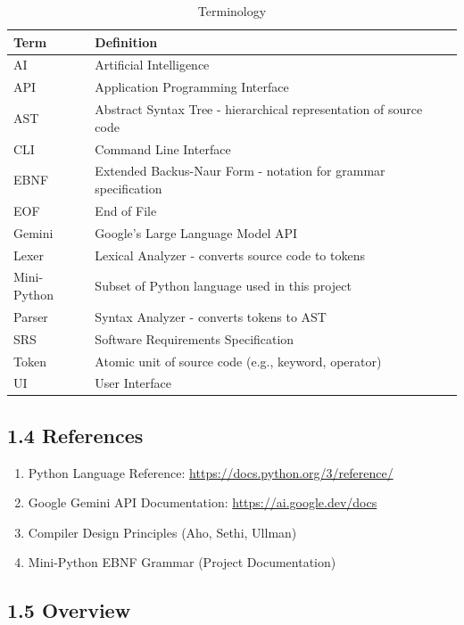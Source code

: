 \documentclass[a4paper,11pt]{article}
\begin{document}
\begin{table}[H]
\centering
\begin{tabularx}{\textwidth}{|l|X|}
\hline
\rowcolor{blue!10}
\textbf{Term} & \textbf{Definition} \\
\hline
AI & Artificial Intelligence \\
\hline
API & Application Programming Interface \\
\hline
AST & Abstract Syntax Tree - hierarchical representation of source code \\
\hline
CLI & Command Line Interface \\
\hline
EBNF & Extended Backus-Naur Form - notation for grammar specification \\
\hline
EOF & End of File \\
\hline
Gemini & Google's Large Language Model API \\
\hline
Lexer & Lexical Analyzer - converts source code to tokens \\
\hline
Mini-Python & Subset of Python language used in this project \\
\hline
Parser & Syntax Analyzer - converts tokens to AST \\
\hline
SRS & Software Requirements Specification \\
\hline
Token & Atomic unit of source code (e.g., keyword, operator) \\
\hline
UI & User Interface \\
\hline
\end{tabularx}
\caption{Terminology}
\end{table}

\subsection{1.4 References}

\begin{enumerate}
    \item Python Language Reference: \url{https://docs.python.org/3/reference/}
    \item Google Gemini API Documentation: \url{https://ai.google.dev/docs}
    \item Compiler Design Principles (Aho, Sethi, Ullman)
    \item Mini-Python EBNF Grammar (Project Documentation)
\end{enumerate}

\subsection{1.5 Overview}
\end{document}
